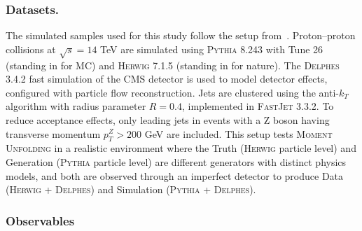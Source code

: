         \subsubsection{Datasets.}
            The simulated samples used for this study follow the setup from~\cite{andreassen_omnifold_2020}.
            Proton--proton collisions at $\sqrt{s} = 14$ TeV are simulated using \textsc{Pythia 8.243} with Tune 26 (standing in for MC) and \textsc{Herwig 7.1.5} (standing in for nature).
            The \textsc{Delphes 3.4.2} fast simulation of the CMS detector is used to model detector effects, configured with particle flow reconstruction.
            Jets are clustered using the anti-$k_T$ algorithm with radius parameter $R = 0.4$, implemented in \textsc{FastJet 3.3.2}.
            To reduce acceptance effects, only leading jets in events with a Z boson having transverse momentum $p_T^Z > 200$ GeV are included.
            This setup tests \textsc{Moment Unfolding} in a realistic environment where the Truth (\textsc{Herwig} particle level) and Generation (\textsc{Pythia} particle level) are different generators with distinct physics models, and both are observed through an imperfect detector to produce Data (\textsc{Herwig + Delphes}) and Simulation (\textsc{Pythia + Delphes}).
            
            \subsubsection{Observables}
            
